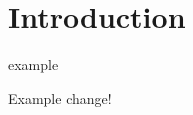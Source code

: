 \section{Introduction} \label{sec:introduction}

example \citep{gagliardi2019international}


Example change!
